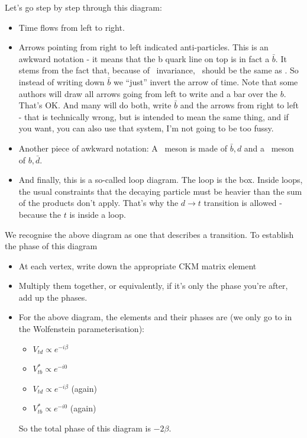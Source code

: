  Let's go step by step through this diagram:
\begin{itemize}
 \item Time flows from left to right.
 \item Arrows pointing from right to left indicated
 anti-particles. This is an awkward notation - it means that the b
 quark line on top is in fact a $\bar{b}$. It stems from the fact
 that, because of \cpt\ invariance, \cp\ should be the same as \ts. So
 instead of writing down $\bar{b}$ we ``just'' invert the arrow of time.
 Note that some authors will draw all arrows going from left to write
 and a bar over the $b$. That's OK. And many will do both, write
 $\bar{b}$ and the arrows from right to left - that is technically
 wrong, but is intended to mean the same thing, and if you want, you can also use that system, I'm not going to be too fussy.
 \item Another piece of awkward notation: A \Bdo\ meson is made of
 $\bar{b}, d$ and a \Bdob\ meson of $b, \bar{d}$.
 \item And finally, this is a so-called loop diagram. The loop is the
 box. Inside loops, the usual constraints that the decaying particle
 must be heavier than the sum of the products don't apply. That's why
 the $d\to t$ transition is allowed - because the $t$ is inside a
 loop.
\end{itemize}

We recognise the above diagram as
one that describes a \prt{\Bdo \to \Bob} transition. To establish the
phase of this diagram
\begin{itemize}
 \item At each vertex, write down the appropriate CKM matrix
 element
 \item Multiply them together, or equivalently, if it's only the phase
 you're after, add up the phases.
 \item For the above diagram, the elements and their phases are (we
 only go to  in the Wolfenstein parameterisation):
 \begin{itemize}
 \item $V_{td} \propto e^{-i\beta}$
 \item $V_{tb}^* \propto e^{-i 0}$
 \item $V_{td} \propto e^{-i\beta}$ (again)
 \item $V_{tb}^* \propto e^{-i 0}$ (again)
 \end{itemize}
 So the total phase of this diagram is $-2\beta$.
\end{itemize}

